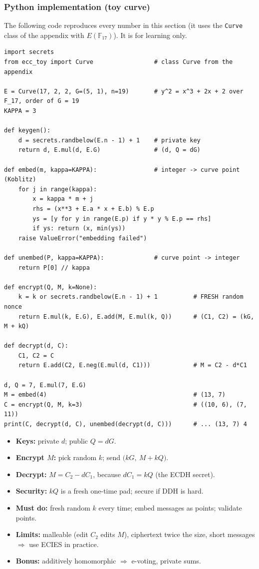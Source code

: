 \documentclass[11pt,a4paper,oneside]{book}
\theoremstyle{plain}
\theoremstyle{definition}
\theoremstyle{remark}
\newcommand{\F}{\mathbb{F}}
\begin{document}
\subsubsection*{Python implementation (toy curve)}

The following code reproduces every number in this section (it uses the \texttt{Curve} class of the appendix with $E(\F_{17})$). It is for learning only.
\begin{lstlisting}[style=py]
import secrets
from ecc_toy import Curve                 # class Curve from the appendix

E = Curve(17, 2, 2, G=(5, 1), n=19)       # y^2 = x^3 + 2x + 2 over F_17, order of G = 19
KAPPA = 3

def keygen():
    d = secrets.randbelow(E.n - 1) + 1    # private key
    return d, E.mul(d, E.G)               # (d, Q = dG)

def embed(m, kappa=KAPPA):                # integer -> curve point (Koblitz)
    for j in range(kappa):
        x = kappa * m + j
        rhs = (x**3 + E.a * x + E.b) % E.p
        ys = [y for y in range(E.p) if y * y % E.p == rhs]
        if ys: return (x, min(ys))
    raise ValueError("embedding failed")

def unembed(P, kappa=KAPPA):              # curve point -> integer
    return P[0] // kappa

def encrypt(Q, M, k=None):
    k = k or secrets.randbelow(E.n - 1) + 1          # FRESH random nonce
    return E.mul(k, E.G), E.add(M, E.mul(k, Q))      # (C1, C2) = (kG, M + kQ)

def decrypt(d, C):
    C1, C2 = C
    return E.add(C2, E.neg(E.mul(d, C1)))            # M = C2 - d*C1

d, Q = 7, E.mul(7, E.G)
M = embed(4)                                         # (13, 7)
C = encrypt(Q, M, k=3)                               # ((10, 6), (7, 11))
print(C, decrypt(d, C), unembed(decrypt(d, C)))      # ... (13, 7) 4
\end{lstlisting}

\begin{keyidea}
\begin{itemize}[nosep]
\item \textbf{Keys:} private $d$; public $Q=dG$.
\item \textbf{Encrypt $M$:} pick random $k$; send $\big(kG,\ M+kQ\big)$.
\item \textbf{Decrypt:} $M=C_2-dC_1$, because $dC_1=kQ$ (the ECDH secret).
\item \textbf{Security:} $kQ$ is a fresh one-time pad; secure if DDH is hard.
\item \textbf{Must do:} fresh random $k$ every time; embed messages as points; validate points.
\item \textbf{Limits:} malleable (edit $C_2$ edits $M$), ciphertext twice the size, short messages $\Rightarrow$ use ECIES in practice.
\item \textbf{Bonus:} additively homomorphic $\Rightarrow$ e-voting, private sums.
\end{itemize}
\end{keyidea}
\end{document}
